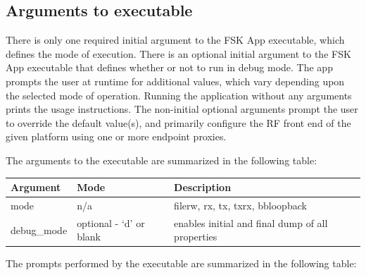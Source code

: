 \subsection{Arguments to executable}
There is only one required initial argument to the FSK App executable, which defines the mode of execution. There is an optional initial argument to the FSK App executable that defines whether or not to run in debug mode. The app prompts the user at runtime for additional values, which vary depending upon the selected mode of operation. Running the application without any arguments prints the usage instructions. The non-initial optional arguments prompt the user to override the default value(s), and primarily configure the RF front end of the given platform using one or more endpoint proxies.\par\medskip
\noindent The arguments to the executable are summarized in the following table:\\
\begin{tabular}{|l|l|l|}
\hline
\rowcolor{blue}
Argument & Mode & Description \\
\hline
mode & n/a & filerw, rx, tx, txrx, bbloopback\\
\hline
debug\_mode & optional - `d' or blank & enables initial and final dump of all properties\\
\hline
\end{tabular}\par\medskip
\noindent The prompts performed by the executable are summarized in the following table:\\
